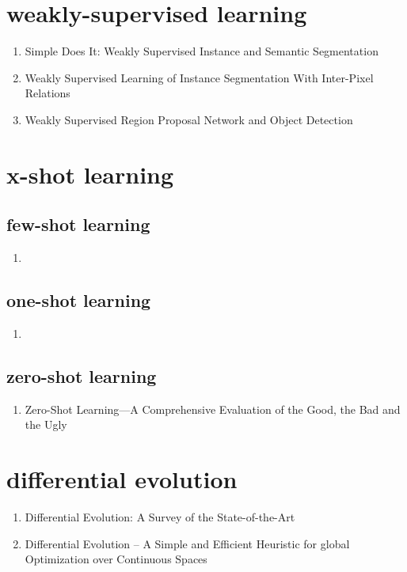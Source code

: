 \documentclass[acmlarge]{acmart}
\begin{document}
\section{weakly-supervised learning}
\begin{enumerate}
	\item Simple Does It: Weakly Supervised Instance and Semantic Segmentation \cite{Khoreva2017SimpleDI} 

	\item Weakly Supervised Learning of Instance Segmentation With Inter-Pixel Relations \cite{Ahn2019WeaklySL} 

	\item Weakly Supervised Region Proposal Network and Object Detection \cite{Tang2018WeaklySR} 

\end{enumerate}
\section{x-shot learning}
	\subsection{few-shot learning}
	\begin{enumerate}
		\item
	\end{enumerate}
	\subsection{one-shot learning}
	\begin{enumerate}
		\item
	\end{enumerate}
	\subsection{zero-shot learning}
	\begin{enumerate}
		\item Zero-Shot Learning—A Comprehensive Evaluation of the Good, the Bad and the Ugly \cite{Xian2019ZeroShotLC} 

	\end{enumerate}
\begin{enumerate}
\end{enumerate}
\section{differential evolution}
\begin{enumerate}
	\item Differential Evolution: A Survey of the State-of-the-Art \cite{Das2011DifferentialEA} 

	\item Differential Evolution – A Simple and Efficient Heuristic for global Optimization over Continuous Spaces \cite{Storn1997DifferentialE} 

\end{enumerate}
\end{document}
